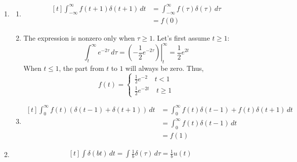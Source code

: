 \documentclass[12pt]{article}
\begin{document}
\begin{enumerate}
\begin{enumerate}
\begin{enumerate}
                        \end{enumerate}
                  \item \begin{enumerate}
                              \item \[\begin{aligned}[t]
                                                \int_{-\infty}^{\infty} f(t+1)\delta(t+1)\,dt
                                                 & = \int_{-\infty}^{\infty} f(\tau)\delta(\tau)\,d\tau \\
                                                 & = \boxed{f(0)}
                                          \end{aligned}\]
                              \item The expression is nonzero only when $\tau \ge 1$.
                                    Let's first assume $t \ge 1$:
                                    \[\int_{t}^{\infty} e^{-2\tau}\,d\tau = \left.\left(-\frac{1}{2}e^{-2\tau}\right)\right|^\infty_t = \frac{1}{2}e^{2t}\]
                                    When $t \le 1$, the part from $t$ to $1$ will always be zero.
                                    Thus,
                                    \[f(t)=\begin{cases}
                                                \frac{1}{2}e^{-2}\quad t < 1 \\
                                                \frac{1}{2}e^{-2t}\quad t \ge 1
                                          \end{cases}\]
                              \item \[\begin{aligned}[t]
                                                \int_{0}^{\infty} f(t)(\delta(t-1)+\delta(t+1))\,dt
                                                 & = \int_{0}^{\infty} f(t)\delta(t-1)+f(t)\delta(t+1)\,dt \\
                                                 & = \int_{0}^{\infty} f(t)\delta(t-1)\,dt                 \\
                                                 & = \boxed{f(1)}
                                          \end{aligned}\]
                        \end{enumerate}
                  \item \[\begin{gathered}[t]
                                    \int \delta(bt)\,dt = \int \frac{1}{b}\delta(\tau)\,d\tau=\frac{1}{b}u(t) \\

\end{gathered}\]
\end{enumerate}
\end{enumerate}
\end{document}
